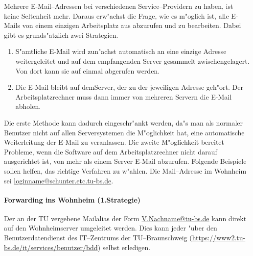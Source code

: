 Mehrere E-Mail--Adressen bei verschiedenen Service--Providern zu haben, ist
keine Seltenheit mehr. Daraus erw"achst die Frage, wie es m"oglich ist, alle
\glossar E-Mails von einem einzigen Arbeitsplatz aus abzurufen und zu
bearbeiten. Dabei gibt es grunds"atzlich zwei Strategien. 

\begin{enumerate}
  \item S"amtliche \glossar E-Mail wird zun"achst automatisch an eine einzige
    Adresse weitergeleitet und auf dem empfangenden \glossar Server gesammelt
    zwischengelagert. Von dort kann sie auf einmal abgerufen werden. 
  \item Die \glossar E-Mail bleibt auf dem\glossar  Server, der zu der
    jeweiligen Adresse geh"ort. Der Arbeitsplatzrechner muss dann immer von
    mehreren \glossar Servern die \glossar E-Mail abholen.
\end{enumerate} 

Die erste Methode kann dadurch eingeschr"ankt werden, da"s man als normaler
Benutzer nicht auf allen \glossar Serversystemen die M"oglichkeit hat, eine
automatische Weiterleitung der \glossar E-Mail zu veranlassen. Die zweite
M"oglichkeit bereitet Probleme, wenn die Software auf dem Arbeitsplatzrechner
nicht darauf ausgerichtet ist, von mehr als einem \glossar Server \glossar
E-Mail abzurufen. Folgende Beispiele sollen helfen, das richtige Verfahren zu
w"ahlen. Die Mail--Adresse im Wohnheim sei \url{loginname@schunter.etc.tu-bs.de}.

\paragraph*{Forwarding ins Wohnheim (1.Strategie)}


Der an der TU vergebene Mailalias der Form \url{V.Nachname@tu-bs.de} kann
direkt auf den Wohnheimserver umgeleitet werden. Dies kann jeder "uber den
Benutzerdatendienst des IT--Zentrums der TU--Braunschweig
(\url{https://www2.tu-bs.de/it/services/benutzer/bdd}) selbst erledigen.

